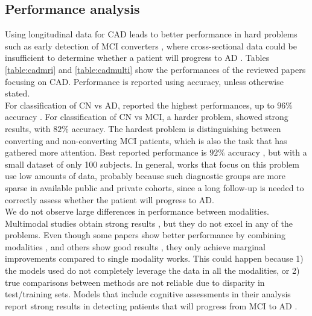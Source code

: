 \normalsize

\subsection{Performance analysis}

Using longitudinal data for CAD leads to better performance in hard problems such as early detection of MCI converters \cite{Ardekani2016,Sanroma2017,Sun2017,Thung2016}, where cross-sectional data could be insufficient to determine whether a patient will progress to AD \cite{cuingnet}. Tables \ref{table:cadmri} and \ref{table:cadmulti} show the performances of the reviewed papers focusing on CAD. Performance is reported using accuracy, unless otherwise stated. \\

For classification of CN vs AD, \cite{Gavidia-Bovadilla2017,Li2012,Ortiz2017,Shi2015,Shi2017} reported the highest performances, up to $96\%$ accuracy \cite{Li2012}. For classification of CN vs MCI, a harder problem, \cite{Gavidia-Bovadilla2017} showed strong results, with $82\%$ accuracy. The hardest problem is distinguishing between converting and non-converting MCI patients, which is also the task that has gathered more attention. Best reported performance is $92\%$ accuracy \cite{Sun2017}, but with a small dataset of only 100 subjects. In general, works that focus on this problem use low amounts of data, probably because such diagnostic groups are more sparse in available public and private cohorts, since a long follow-up is needed to correctly assess whether the patient will progress to AD. \\

We do not observe large differences in performance between modalities. Multimodal studies obtain strong results \cite{Chen2015,Hinrichs2011,Minhas2016,Minhas2018}, but they do not excel in any of the problems. Even though some papers show better performance by combining modalities \cite{Hinrichs2011}, and others show good results \cite{Ardekani2016,Chi2017,Minhas2016,Minhas2018}, they only achieve marginal improvements compared to single modality works. This could happen because 1) the models used do not completely leverage the data in all the modalities, or 2) true comparisons between methods are not reliable due to disparity in test/training sets. Models that include cognitive assessments in their analysis report strong results in detecting patients that will progress from MCI to AD \cite{Chen2015,Thung2018,Aghili2018,Minhas2016,Minhas2018,Ardekani2016,Mubeen2017}. \\



